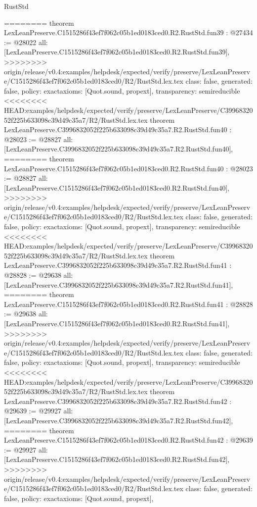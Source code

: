 \begin{lexlean}{RustStd}
\begin{coremodule}
{\begin{coremodule}
{{{{{{{{{{{{{{{{{{{{{{{{{{{{{{{{{{{{{{{{{{========
theorem LexLeanPreserve.C1515286f43ef7f062c05b1ed0183ced0.R2.RustStd.fun39 : @27434 := @28022 {
  all: [LexLeanPreserve.C1515286f43ef7f062c05b1ed0183ced0.R2.RustStd.fun39],
>>>>>>>> origin/release/v0.4:examples/helpdesk/expected/verify/preserve/LexLeanPreserve/C1515286f43ef7f062c05b1ed0183ced0/R2/RustStd.lex.tex
  class: false,
  generated: false,
  policy: exact{axioms: [Quot.sound, propext]},
  transparency: semireducible
}
<<<<<<<< HEAD:examples/helpdesk/expected/verify/preserve/LexLeanPreserve/C3996832052f225b633098c39d49c35a7/R2/RustStd.lex.tex
theorem LexLeanPreserve.C3996832052f225b633098c39d49c35a7.R2.RustStd.fun40 : @28023 := @28827 {
  all: [LexLeanPreserve.C3996832052f225b633098c39d49c35a7.R2.RustStd.fun40],
========
theorem LexLeanPreserve.C1515286f43ef7f062c05b1ed0183ced0.R2.RustStd.fun40 : @28023 := @28827 {
  all: [LexLeanPreserve.C1515286f43ef7f062c05b1ed0183ced0.R2.RustStd.fun40],
>>>>>>>> origin/release/v0.4:examples/helpdesk/expected/verify/preserve/LexLeanPreserve/C1515286f43ef7f062c05b1ed0183ced0/R2/RustStd.lex.tex
  class: false,
  generated: false,
  policy: exact{axioms: [Quot.sound, propext]},
  transparency: semireducible
}
<<<<<<<< HEAD:examples/helpdesk/expected/verify/preserve/LexLeanPreserve/C3996832052f225b633098c39d49c35a7/R2/RustStd.lex.tex
theorem LexLeanPreserve.C3996832052f225b633098c39d49c35a7.R2.RustStd.fun41 : @28828 := @29638 {
  all: [LexLeanPreserve.C3996832052f225b633098c39d49c35a7.R2.RustStd.fun41],
========
theorem LexLeanPreserve.C1515286f43ef7f062c05b1ed0183ced0.R2.RustStd.fun41 : @28828 := @29638 {
  all: [LexLeanPreserve.C1515286f43ef7f062c05b1ed0183ced0.R2.RustStd.fun41],
>>>>>>>> origin/release/v0.4:examples/helpdesk/expected/verify/preserve/LexLeanPreserve/C1515286f43ef7f062c05b1ed0183ced0/R2/RustStd.lex.tex
  class: false,
  generated: false,
  policy: exact{axioms: [Quot.sound, propext]},
  transparency: semireducible
}
<<<<<<<< HEAD:examples/helpdesk/expected/verify/preserve/LexLeanPreserve/C3996832052f225b633098c39d49c35a7/R2/RustStd.lex.tex
theorem LexLeanPreserve.C3996832052f225b633098c39d49c35a7.R2.RustStd.fun42 : @29639 := @29927 {
  all: [LexLeanPreserve.C3996832052f225b633098c39d49c35a7.R2.RustStd.fun42],
========
theorem LexLeanPreserve.C1515286f43ef7f062c05b1ed0183ced0.R2.RustStd.fun42 : @29639 := @29927 {
  all: [LexLeanPreserve.C1515286f43ef7f062c05b1ed0183ced0.R2.RustStd.fun42],
>>>>>>>> origin/release/v0.4:examples/helpdesk/expected/verify/preserve/LexLeanPreserve/C1515286f43ef7f062c05b1ed0183ced0/R2/RustStd.lex.tex
  class: false,
  generated: false,
  policy: exact{axioms: [Quot.sound, propext]},
}}}}}}}}}}}}}}}}}}}}}}}}}}}}}}}}}}}}}}}}}}}}}}
\end{coremodule}}
\end{coremodule}
\end{lexlean}
